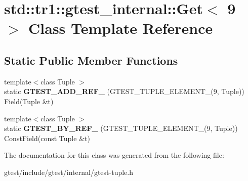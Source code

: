 \hypertarget{classstd_1_1tr1_1_1gtest__internal_1_1Get_3_019_01_4}{}\section{std\+:\+:tr1\+:\+:gtest\+\_\+internal\+:\+:Get$<$ 9 $>$ Class Template Reference}
\label{classstd_1_1tr1_1_1gtest__internal_1_1Get_3_019_01_4}
\subsection*{Static Public Member Functions}
\begin{DoxyCompactItemize}
\item 
\mbox{\label{classstd_1_1tr1_1_1gtest__internal_1_1Get_3_019_01_4_add31197dfdb381d265e221ed62129f45}} 
{\footnotesize template$<$class Tuple $>$ }\\static {\bfseries G\+T\+E\+S\+T\+\_\+\+A\+D\+D\+\_\+\+R\+E\+F\+\_\+} (G\+T\+E\+S\+T\+\_\+\+T\+U\+P\+L\+E\+\_\+\+E\+L\+E\+M\+E\+N\+T\+\_\+(9, Tuple)) Field(Tuple \&t)
\item 
\mbox{\label{classstd_1_1tr1_1_1gtest__internal_1_1Get_3_019_01_4_a5205e8da729e2bee446f5be0c65390af}} 
{\footnotesize template$<$class Tuple $>$ }\\static {\bfseries G\+T\+E\+S\+T\+\_\+\+B\+Y\+\_\+\+R\+E\+F\+\_\+} (G\+T\+E\+S\+T\+\_\+\+T\+U\+P\+L\+E\+\_\+\+E\+L\+E\+M\+E\+N\+T\+\_\+(9, Tuple)) Const\+Field(const Tuple \&t)
\end{DoxyCompactItemize}


The documentation for this class was generated from the following file\+:\begin{DoxyCompactItemize}
\item 
gtest/include/gtest/internal/gtest-\/tuple.\+h\end{DoxyCompactItemize}
